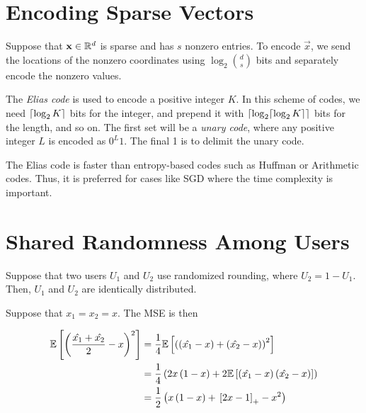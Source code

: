 \documentclass[twoside]{article}
\begin{document}



\section{Encoding Sparse Vectors}

Suppose that \(\boldsymbol{\mathbf{x}}\in\mathbb R^d\) is sparse and has \(s\) nonzero entries. To
encode \(\vec{x}\), we send the locations of the nonzero coordinates using
\(\log_2\binom{d}{s}\) bits and separately encode the nonzero values.

The \emph{Elias code} is used to encode a positive integer \(K\). In this scheme
of codes, we need \(\lceil\log_2 K\rceil\) bits for the integer, and prepend it with
\(\lceil\log_2 \lceil\log_2 K\rceil\rceil\) bits for the length, and so on. The first set
will be a \emph{unary code}, where any positive integer \(L\) is encoded as
\(0^{L}1\). The final 1 is to delimit the unary code.

The Elias code is faster than entropy-based codes such as Huffman or
Arithmetic codes. Thus, it is preferred for cases like SGD where the time
complexity is important.

\section{Shared Randomness Among Users}

Suppose that two users \(U_1\) and \(U_2\) use randomized rounding, where 
\(U_2 = 1 - U_1\). Then, \(U_1\) and \(U_2\) are identically distributed.

Suppose that \(x_1 = x_2 = x\). The MSE is then

\begin{align}
    \mathbb{E}\left[ \left(\frac{\hat{x_1} + \hat{x_2}}{2}-x\right)^2 \right] &= \frac{1}{4}\mathbb{E}\left[ \left(\left(\hat{x_1}-x\right)+\left(\hat{x_2}-x\right)\right)^2 \right] \\
                                                      &= \frac{1}{4}\left(2x\left(1-x\right)+2\mathbb{E}\left[ \left(\hat{x_1}-x\right)\left(\hat{x_2}-x\right) \right]\right) \\
                                                      &= \frac{1}{2}\left(x\left(1-x\right)+{}\left[2x-1\right]_+ - x^2\right)
                                                      \label{eq:mse-shared-rand}
\end{align}
\end{document}
